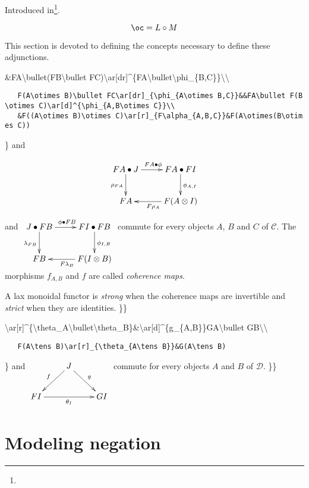 Introduced in\footnote{}.

\todo[citation]

\[\oc=L\circ M\]

This section is devoted to defining the concepts necessary to define
these adjunctions.

\&FA\textbackslash{}bullet(FB\textbackslash{}bullet
FC)\textbackslash{}ar{[}dr{]}\^{}\{FA\textbackslash{}bullet\textbackslash{}phi\_\{B,C\}\}\textbackslash{}\textbackslash{}

\texttt{~~~F(A\textbackslash{}otimes~B)\textbackslash{}bullet~FC\textbackslash{}ar{[}dr{]}\_\{\textbackslash{}phi\_\{A\textbackslash{}otimes~B,C\}\}\&\&FA\textbackslash{}bullet~F(B\textbackslash{}otimes~C)\textbackslash{}ar{[}d{]}\^{}\{\textbackslash{}phi\_\{A,B\textbackslash{}otimes~C\}\}\textbackslash{}\textbackslash{}}\\
\texttt{~~~\&F((A\textbackslash{}otimes~B)\textbackslash{}otimes~C)\textbackslash{}ar{[}r{]}\_\{F\textbackslash{}alpha\_\{A,B,C\}\}\&F(A\textbackslash{}otimes(B\textbackslash{}otimes~C))}

\} and

\[\xymatrix{
    FA\bullet J\ar[d]_{\rho_{FA}}\ar[r]^{FA\bullet\phi}& FA\bullet FI\ar[d]^{\phi_{A,I}}\\
    FA& \ar[l]^{F\rho_A}F(A\otimes I)
}\] and \(\xymatrix{
    J\bullet FB\ar[d]_{\lambda_{FB}}\ar[r]^{\phi\bullet FB}& FI\bullet FB\ar[d]^{\phi_{I,B}}\\
    FB& \ar[l]^{F\lambda_B}F(I\otimes B)
}\) commute for every objects \(A\), \(B\) and \(C\) of \(\mathcal{C}\).
The morphisms \(f_{A,B}\) and \(f\) are called \emph{coherence maps}.

A lax monoidal functor is \emph{strong} when the coherence maps are
invertible and \emph{strict} when they are identities. \}\}

\textbackslash{}ar{[}r{]}\^{}\{\textbackslash{}theta\_A\textbackslash{}bullet\textbackslash{}theta\_B\}\&\textbackslash{}ar{[}d{]}\^{}\{g\_\{A,B\}\}GA\textbackslash{}bullet
GB\textbackslash{}\textbackslash{}

\texttt{~~~F(A\textbackslash{}tens~B)\textbackslash{}ar{[}r{]}\_\{\textbackslash{}theta\_\{A\textbackslash{}tens~B\}\}\&G(A\textbackslash{}tens~B)}

\} and \(\xymatrix{
  & \ar[dl]_{f}J\ar[dr]^{g}& \\
  FI\ar[rr]_{\theta_I}& & GI
}\) commute for every objects \(A\) and \(B\) of \(\mathcal{D}\). \}\}

\section{Modeling negation}\label{modeling-negation}

